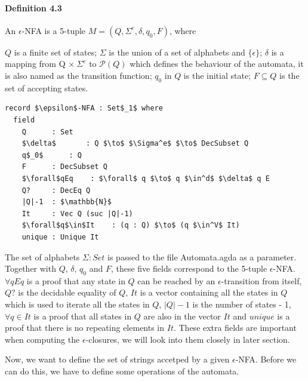 \documentclass[twoside,openright,final]{bhamthesis}
\renewcommand{\item}{\itemindent0.5cm\itemold}
\begin{document}
\paragraph{Definition 4.3} An \(\epsilon\)-NFA is a 5-tuple \(M = (Q ,
\Sigma^e, \delta, q_0, F)\), where
\begin{enumerate}
  \item \(Q\) is a finite set of states;
  \item \(\Sigma\) is the union of a set of alphabets and \(\{\epsilon\}\);
  \item \(\delta\) is a mapping from Q \(\times\ \Sigma^e\) to
    \(\mathcal P \left({Q}\right)\) which defines the behaviour of the
    automata, it is also named as the transition function;
  \item \(q_0\) in \(Q\) is the initial state;
  \item \(F \subseteq Q\) is the set of
    accepting states.
\end{enumerate}
\begin{lstlisting}[caption=\(\epsilon\)-NFA,mathescape=true]
record $\epsilon$-NFA : Set$_1$ where
  field
    Q      : Set
    $\delta$       : Q $\to$ $\Sigma^e$ $\to$ DecSubset Q
    q$_0$      : Q
    F      : DecSubset Q
    $\forall$qEq    : $\forall$ q $\to$ q $\in^d$ $\delta$ q E
    Q?     : DecEq Q
    |Q|-1  : $\mathbb{N}$
    It     : Vec Q (suc |Q|-1)
    $\forall$q$\in$It    : (q : Q) $\to$ (q $\in^V$ It)
    unique : Unique It
\end{lstlisting}

\par The set of alphabets \(\Sigma : Set\) is passed to the file
Automata.agda as a parameter. Together with \(Q\), \(\delta\),
\(q_0\) and \(F\), these five fields correspond to the 5-tuple
\(\epsilon\)-NFA. \(\forall qEq\) is a proof that any state in \(Q\)
can be reached by an \(\epsilon\)-transition from itself, \(Q?\) is
the decidable equality of \(Q\), \(It\) is a vector containing all the
states in \(Q\) which is used to iterate all the states in
\(Q\), \(|Q|-1\) is the number of states - 1, \(\forall q\in It\) is a
proof that all states in \(Q\) are also in the vector \(It\) and
\(unique\) is a proof that there is no repeating elements in
\(It\). These extra fields are important when computing the
\(\epsilon\)-closures, we will look into them closely in later
section. 

\par Now, we want to define the set of strings accetped by a given
\(\epsilon\)-NFA. Before we can do this, we have to define some
operations of the automata.
\end{document}
